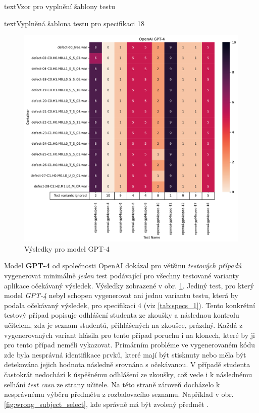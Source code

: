 \documentclass[czech, ma, kiv, he, iso690numb, pdf, viewonly]{fasthesis}
\begin{document}
\begin{code}{text}{Vzor pro vyplnění šablony testu \label{lst:template}}
{\begin{code}{text}{Vyplněná šablona testu pro specifikaci 18 \label{lst:spec18}}
{            \begin{figure}
                \includegraphics[width=\textwidth]{pic/gpt-4-results.pdf}
                \caption{Výsledky pro model GPT-4}
                \label{fig:res:gpt-4}
            \end{figure}

            Model \textbf{GPT-4} od společnosti OpenAI dokázal pro většinu \textit{testových případů} vygenerovat minimálně \emph{jeden} test podávající pro všechny testované varianty aplikace očekávaný výsledek. Výsledky zobrazené v obr. \ref{fig:res:gpt-4}. Jediný test, pro který model \textit{GPT-4} nebyl schopen vygenerovat ani jednu variantu testu, která by podala očekávaný výsledek, pro specifikaci 4 (viz \ref{tab:specs_1}). Tento konkrétní testový případ popisuje odhlášení studenta ze zkoušky a následnou kontrolu učitelem, zda je seznam studentů, přihlášených na zkoušce, prázdný. Každá z vygenerovaných variant hlásila pro tento případ poruchu i na klonech, které by ji pro tento případ neměli vykazovat. Primárním probléme ve vygenerovaném kódu zde byla nesprávná identifikace prvků, které mají být stisknuty nebo měla být detekována jejich hodnota následně srovnána s očekávanou. V případě studenta častokrát nedochází k úspěšnému odhlášení ze zkoušky, což vede i k následnému selhání \textit{test casu} ze strany učitele. Na této straně zároveň docházelo k nesprávnému výběru předmětu z rozbalovacího seznamu. Například v obr. \ref{fig:wrong_subject_select}, kde správně má být zvolený předmět .

}
\end{code}}
\end{code}
\end{document}
